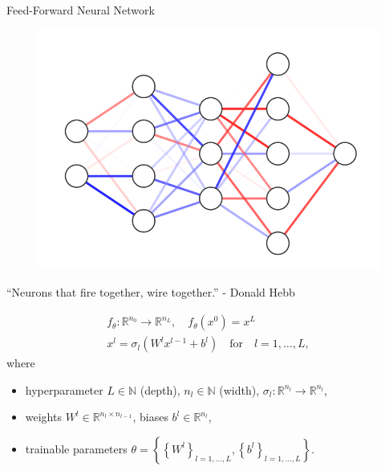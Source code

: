 \documentclass[9pt]{beamer}
\begin{document}
\begin{frame}{Feed-Forward Neural Network}
    \begin{figure}[H]
        \begin{center}
            \includegraphics[scale=0.35]{img/Neural Network.png}
        \end{center}
    \end{figure}
    \begin{center}
        \small{“Neurons that fire together, wire together.” - Donald Hebb}
    \end{center}
    \begin{equation*}
        \begin{gathered}
            f_{\theta} \colon \mathbb{R}^{n_0} \to \mathbb{R}^{n_L}, \quad f_{\theta} \left( x^{0}\right) = x^{L} \\
            x^{l} = \sigma_l \left( W^l x^{l-1} + b^l \right) \quad \text{for} \quad l = 1, \ldots, L, 
        \end{gathered}
    \end{equation*}
    where 
    \begin{itemize}
        \item hyperparameter $L \in \mathbb{N}$ (depth), $n_l \in \mathbb{N}$ (width), $\sigma_l \colon \mathbb{R}^{n_l} \to \mathbb{R}^{n_l}$,
        \item weights $W^l \in \mathbb{R}^{n_l \times n_{l-1}}$, biases $b^l \in \mathbb{R}^{n_l}$,
        \item trainable parameters $\theta = \left\{ \left\{ W^l \right\}_{l=1, \ldots, L}, \left\{ b^l \right\}_{l=1, \ldots, L} \right\}$.
    \end{itemize}

\end{frame}
\end{document}
